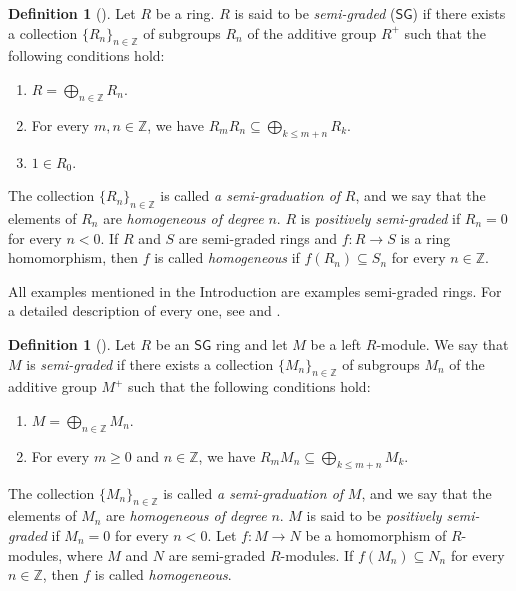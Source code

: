 \documentclass[reqno]{amsart}
\theoremstyle{definition}
\newtheorem{definition}[theorem]{Definition}
\theoremstyle{remark}
\numberwithin{equation}{section}
\begin{document}
\begin{definition}[{\cite[Definition 2.1]{LezamaLatorre2017}}]\label{def.SG2}
Let $R$ be a ring. $R$ is said to be {\em semi-graded} ($\mathsf{SG}$) if there exists a collection $\{R_n\}_{n\in\mathbb{Z}}$ of subgroups $R_n$ of the additive group $R^{+}$ such that the following conditions hold:
\begin{enumerate}
    \item [\rm (i)] $R=\bigoplus\limits_{n\in\mathbb{Z}}R_n$.
    
    \item [\rm (ii)] For every $m,n\in\mathbb{Z}$, we have $R_mR_n\subseteq \bigoplus\limits_{k\leq m+n} R_k$. 
    
    \item [\rm (iii)] $1\in R_0$.
\end{enumerate}
\end{definition}

The collection $\{R_n\}_{n\in\mathbb{Z}}$ is called {\em a semi-graduation of} $R$, and we say that the elements of $R_n$ are {\em homogeneous of degree} $n$. $R$ is {\em positively semi-graded} if $R_n=0$ for every $n<0$. If $R$ and $S$ are semi-graded rings and $f: R\rightarrow S$ is a ring homomorphism, then $f$ is called {\em homogeneous} if $f(R_n)\subseteq S_n$ for every $n\in\mathbb{Z}$. 

All examples mentioned in the Introduction are examples semi-graded rings. For a detailed description of every one, see \cite[Chapters 18 and 19]{Fajardoetal2020} and \cite[Section 3]{LezamaReyes2014}.

\begin{definition}[{\cite[Definition 2.2]{LezamaLatorre2017}}]\label{LezamaLatorre2017Definition2.2}
    Let $R$ be an $\mathsf{SG}$ ring and let $M$ be a left $R$-module. We say that $M$ is  {\em semi-graded} if there exists a collection $\{M_n\}_{n\in\mathbb{Z}}$ of subgroups $M_n$ of the additive group $M^+$ such that the following conditions hold:
    \begin{enumerate}
        \item [\rm (i)] $M=\bigoplus\limits_{n\in\mathbb{Z}}M_n$.
        \item [\rm (ii)] For every $m\geq 0$ and $n\in\mathbb{Z}$, we have $R_mM_n\subseteq \bigoplus\limits_{k\leq m+n}M_k$.
    \end{enumerate}
\end{definition}

The collection $\{M_n\}_{n\in\mathbb{Z}}$ is called {\em a semi-graduation of} $M$, and we say that the elements of $M_n$ are {\em homogeneous of degree} $n$. $M$ is said to be {\em positively semi-graded} if $M_n=0$ for every $n<0$. Let $f: M\rightarrow N$ be a homomorphism of $R$-modules, where $M$ and $N$ are semi-graded $R$-modules. If $f(M_n)\subseteq N_n$ for every $n\in\mathbb{Z}$, then $f$ is called {\em homogeneous}. 
\end{document}
